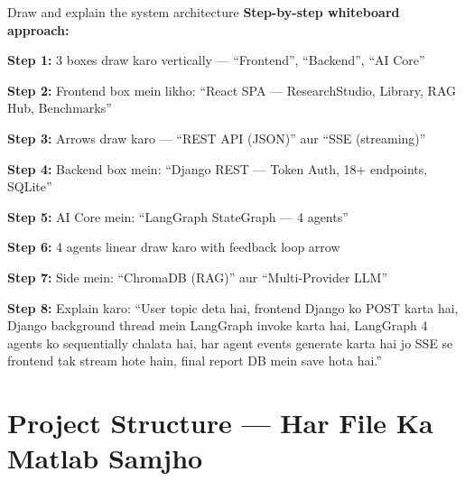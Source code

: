 \documentclass[11pt,a4paper,twoside]{report}
\begin{document}
\begin{interviewbox}{Draw and explain the system architecture}
\textbf{Step-by-step whiteboard approach:}

\textbf{Step 1:} 3 boxes draw karo vertically --- ``Frontend'', ``Backend'', ``AI Core''

\textbf{Step 2:} Frontend box mein likho: ``React SPA --- ResearchStudio, Library, RAG Hub, Benchmarks''

\textbf{Step 3:} Arrows draw karo --- ``REST API (JSON)'' aur ``SSE (streaming)''

\textbf{Step 4:} Backend box mein: ``Django REST --- Token Auth, 18+ endpoints, SQLite''

\textbf{Step 5:} AI Core mein: ``LangGraph StateGraph --- 4 agents''

\textbf{Step 6:} 4 agents linear draw karo with feedback loop arrow

\textbf{Step 7:} Side mein: ``ChromaDB (RAG)'' aur ``Multi-Provider LLM''

\textbf{Step 8:} Explain karo: ``User topic deta hai, frontend Django ko POST karta hai, Django background thread mein LangGraph invoke karta hai, LangGraph 4 agents ko sequentially chalata hai, har agent events generate karta hai jo SSE se frontend tak stream hote hain, final report DB mein save hota hai.''
\end{interviewbox}



\chapter{Project Structure --- Har File Ka Matlab Samjho}
\end{document}
